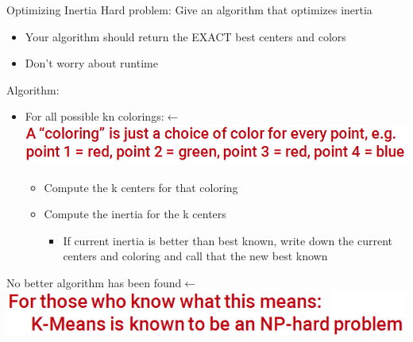 \documentclass[aspectratio=169]{../latex_main/tntbeamer}  %
\begin{document}
	
	\begin{frame}{Optimizing Inertia}
	    Hard problem: Give an algorithm that optimizes inertia
	    \begin{itemize}
	        \item Your algorithm should return the EXACT best centers and colors
	        \item Don’t worry about runtime
	    \end{itemize}
	    Algorithm:
	    \begin{itemize}
	        \item For all possible kn colorings:$\leftarrow$\includegraphics[scale=.35]{Bild25}
	        \begin{itemize}
	            \item Compute the k centers for that coloring
	            \item Compute the inertia for the k centers
	            \begin{itemize}
	                \item If current inertia is better than best known, write down the current centers and coloring and call that the new best known
	            \end{itemize}
	        \end{itemize}
	    \end{itemize}
	    No better algorithm has been found$\leftarrow$\includegraphics[scale=.35]{Bild26}
	    
	\end{frame}
	
	
\end{document}
